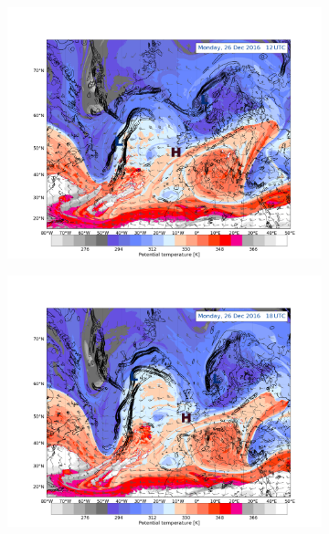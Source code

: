 \begin{figure}[ht!]%
	\centering
	\begin{subfigure}[b]{0.49\textwidth}
		\includegraphics[trim={4.2cm 0cm 4.3cm 5.1cm},clip,
		width=\textwidth]{./fig_DynTropo/20161226_12}
		\caption{} \label{fig:DT26}
	\end{subfigure}
	\begin{subfigure}[b]{0.49\textwidth}
		\includegraphics[trim={4.2cm 0cm 4.3cm 5.1cm},clip,
		width=\textwidth]{./fig_DynTropo/20161226_18}
		\caption{} \label{fig:DT26_18}
	\end{subfigure}

\end{figure}
